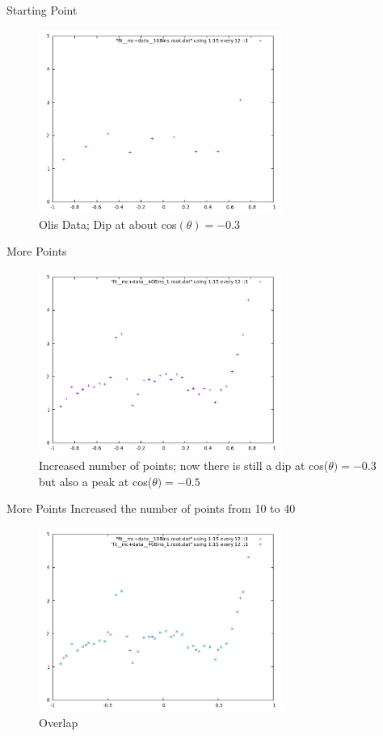 \documentclass[
		10pt
		]{beamer}
\begin{document}
\begin{frame}{Starting Point}


\begin{figure}

	\centering
	\includegraphics[width=8cm]{Plots/Oli10.pdf}
	\caption{Olis Data; Dip at about cos$(\theta)=-0.3$}
\end{figure}
\end{frame}


\begin{frame}{More Points}
	\begin{figure}
		\centering
		\includegraphics[width=8cm]{Plots/Bins40.pdf}
		\caption{Increased number of points; now there is still a dip at cos($\theta)=-0.3$ but also a peak at cos($\theta)=-0.5$}
	\end{figure}
\end{frame}





\begin{frame}{More Points}
	Increased the number of points from 10 to 40
	
	\begin{figure}
		\centering
		\includegraphics[width=8cm]{Plots/OverlapCrossOli40.pdf}
		\caption{Overlap}
	\end{figure}
	
\end{frame}
\end{document}
